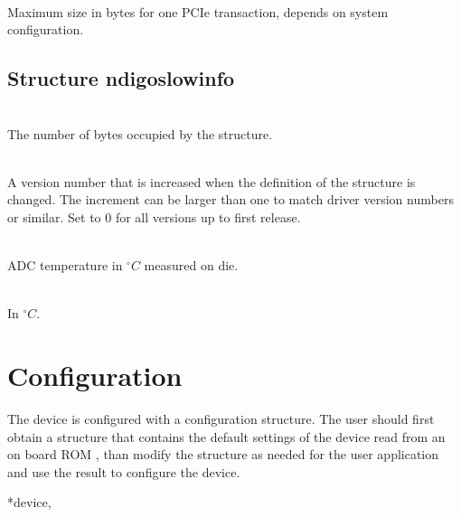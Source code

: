 			\\
			Maximum size in bytes for one PCIe transaction, depends on system configuration.\par
		
		\subsection{Structure ndigo\tu slow\tu info}
		
			\\
			The number of bytes occupied by the structure.\par

			\\
			A version number that is increased when the definition of the structure is changed. The increment can be larger than one to match driver version numbers or similar. Set to 0 for all versions up to
first release.\par

			\\
			ADC temperature in $^{\circ}C$ measured on die.\par

			\\
			In $^{\circ}C$.
		
	\section{Configuration}
	
		The device is configured with a configuration structure. The user should first obtain a structure that contains the default settings of the device read from an on board ROM , than modify the structure as needed for the user application and use the result to configure the device.\par

		\newline {}\par

		\newline {}\par
		
		 {*device,} \par

